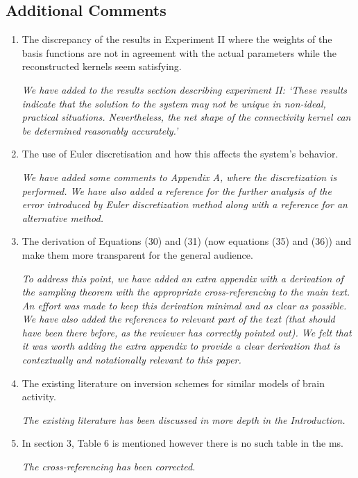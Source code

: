 \documentclass{article}
\begin{document}
    \subsection{Additional Comments}
    
    \begin{enumerate}
        \item The discrepancy of the results in Experiment II where the weights of the basis functions are not in agreement with the actual parameters while the reconstructed kernels seem satisfying.

		\emph{We have added to the results section describing experiment II: `These results indicate that the solution to the system may not be unique in non-ideal, practical situations. Nevertheless, the net shape of the connectivity kernel can be determined reasonably accurately.'}

        \item The use of Euler discretisation and how this affects the system's behavior.

		\emph{We have added some comments to  Appendix A, where the discretization is performed.  We have also added a reference for the further analysis of the error introduced by Euler discretization method along with a reference for an alternative method.}
		
        \item The derivation of Equations (30) and (31) (now equations (35) and (36)) and make them more transparent for the general audience.

\emph{To address this point, we have added an extra appendix with a derivation of the sampling theorem with the appropriate cross-referencing to the main text. An effort was made to keep this derivation minimal and as clear as possible. We have also added the references to relevant part of the text (that should have been there before, as the reviewer has correctly pointed out). We felt that it was worth adding the extra appendix to provide a clear derivation that is contextually and notationally relevant to this paper.}

        \item The existing literature on inversion schemes for similar models of brain activity.

\emph{The existing literature has been discussed in more depth in the Introduction.}

        \item In section 3, Table 6 is mentioned however there is no such table in the ms.

\emph{The cross-referencing has been corrected.}

    \end{enumerate}
    
\end{document}
